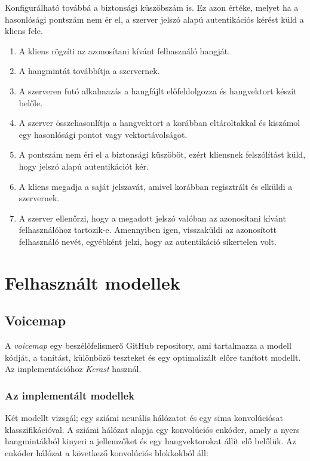 Konfigurálható továbbá a biztonsági küszöbszám is. Ez azon értéke, melyet
ha a hasonlósági pontszám nem ér el, a szerver jelszó alapú autentikációs kérést küld a kliens fele.

\begin{enumerate}
	\item A kliens rögzíti az azonosítani kívánt felhasználó hangját.
	\item A hangmintát továbbítja a szervernek.
	\item A szerveren futó alkalmazás a hangfájlt előfeldolgozza és hangvektort készít belőle.
	\item A szerver összehasonlítja a hangvektort a korábban eltároltakkal és kiszámol egy hasonlósági pontot vagy vektortávolságot.
	\item A pontszám nem éri el a biztonsági küszöböt, ezért kliensnek felszólítást küld, hogy jelszó alapú autentikációt kér.
	\item A kliens megadja a saját jelszavát, amivel  korábban regisztrált és elküldi a szervernek.
	\item A szerver ellenőrzi, hogy a megadott jelszó valóban az azonosítani kívánt felhasználóhoz tartozik-e. Amennyiben igen, visszaküldi az azonosított felhasználó nevét,
	egyébként jelzi, hogy az autentikáció sikertelen volt.
\end{enumerate}

\section{Felhasznált modellek}

\subsection{Voicemap}

A \emph{voicemap} egy beszélőfelismerő GitHub repository, ami tartalmazza a modell kódját, a tanítást, különböző teszteket és egy optimalizált előre tanított modellt. Az implementációhoz \emph{Kerast} használ.

\subsubsection{Az implementált modellek}

Két modellt vizsgál; egy sziámi neurális hálózatot és egy sima konvolúciósat klasszifikációval. A sziámi hálózat alapja egy konvolúciós enkóder, amely a nyers hangmintákból kinyeri a jellemzőket és egy hangvektorokat állít elő belőlük. Az enkóder hálózat a következő konvolúciós blokkokból áll:

